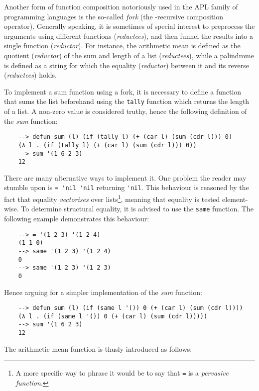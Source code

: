 Another form of function composition notoriously used in the APL family of programming languages is the so-called \textit{fork} (the \mu-recursive composition operator). Generally speaking, it is sometimes of special interest to preprocess the arguments using different functions (\textit{reductees}), and then funnel the results into a single function (\textit{reductor}). For instance, the arithmetic mean is defined as the quotient (\textit{reductor}) of the sum and length of a list (\textit{reductees}), while a palindrome is defined as a string for which the equality (\textit{reductor}) between it and its reverse (\textit{reductees}) holds.

To implement a sum function using a fork, it is necessary to define a function that sums the list beforehand using the \verb|tally| function which returns the length of a list. A non-zero value is considered truthy, hence the following definition of the \textit{sum} function:

\begin{Verbatim}
    --> defun sum (l) (if (tally l) (+ (car l) (sum (cdr l))) 0)
    (λ l . (if (tally l) (+ (car l) (sum (cdr l))) 0))
    --> sum '(1 6 2 3)
    12
\end{Verbatim}

There are many alternative ways to implement it. One problem the reader may stumble upon is \verb|= 'nil 'nil| returning \verb|'nil|. This behaviour is reasoned by the fact that equality \textit{vectorises} over lists\footnote{A more specific way to phrase it would be to say that \verb|=| is a \textit{pervasive function}.}, meaning that equality is tested element-wise. To determine structural equality, it is advised to use the \verb|same| function. The following example demonstrates this behaviour:

\begin{Verbatim}
    --> = '(1 2 3) '(1 2 4)
    (1 1 0)
    --> same '(1 2 3) '(1 2 4)
    0
    --> same '(1 2 3) '(1 2 3)
    0
\end{Verbatim}

Hence arguing for a simpler implementation of the \textit{sum} function:

\begin{Verbatim}
    --> defun sum (l) (if (same l '()) 0 (+ (car l) (sum (cdr l))))
    (λ l . (if (same l '()) 0 (+ (car l) (sum (cdr l)))))
    --> sum '(1 6 2 3)
    12
\end{Verbatim}

The arithmetic mean function is thusly introduced as follows:

